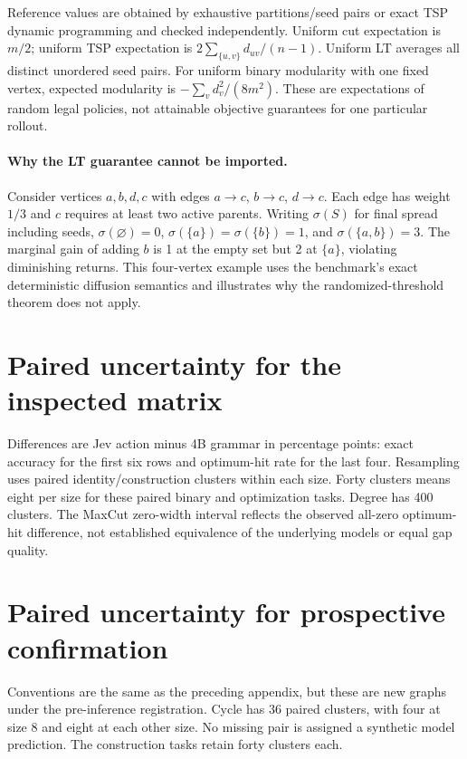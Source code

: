 \documentclass[11pt]{article}
\begin{document}
Reference values are obtained by exhaustive partitions/seed pairs or exact
TSP dynamic programming and checked independently. Uniform cut expectation is
$m/2$; uniform TSP expectation is $2\sum_{\{u,v\}}d_{uv}/(n-1)$.
Uniform LT averages all distinct unordered seed pairs. For uniform binary
modularity with one fixed vertex, expected modularity is
$-\sum_v d_v^2/(8m^2)$. These are expectations of random legal policies,
not attainable objective guarantees for one particular rollout.

\paragraph{Why the LT guarantee cannot be imported.}
Consider vertices $a,b,d,c$ with edges $a\to c$, $b\to c$, $d\to c$.
Each edge has weight $1/3$ and $c$ requires at least two active parents.
Writing $\sigma(S)$ for final spread including seeds,
$\sigma(\varnothing)=0$, $\sigma(\{a\})=\sigma(\{b\})=1$, and
$\sigma(\{a,b\})=3$. The marginal gain of adding $b$ is 1 at the empty set
but 2 at $\{a\}$, violating diminishing returns. This four-vertex example
uses the benchmark's exact deterministic diffusion semantics and illustrates
why the randomized-threshold theorem does not apply.

\section{Paired uncertainty for the inspected matrix}
\centering

\par\raggedright
\smallskip
Differences are Jev action minus 4B grammar in percentage points: exact
accuracy for the first six rows and optimum-hit rate for the last four.
Resampling uses paired identity/construction clusters within each size.
Forty clusters means eight per size for these paired binary and optimization
tasks. Degree has 400 clusters. The MaxCut zero-width interval reflects
the observed all-zero optimum-hit difference, not established equivalence
of the underlying models or equal gap quality.

\section{Paired uncertainty for prospective confirmation}
\centering

\par\raggedright
\smallskip
Conventions are the same as the preceding appendix, but these are new graphs
under the pre-inference registration. Cycle has 36 paired clusters, with four
at size 8 and eight at each other size. No missing pair is assigned a
synthetic model prediction. The construction tasks retain forty clusters each.
\end{document}
